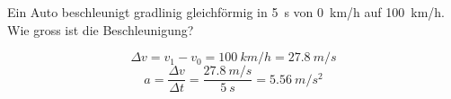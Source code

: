
\begin{aufgabe}
Ein Auto beschleunigt gradlinig gleichförmig in \SI{5}{s} von \SI{0}{km/h} auf \SI{100}{km/h}.
Wie gross ist die Beschleunigung?

\begin{loesung}
\[\Delta v = v_1-v_0=\SI{100}{km/h}= \SI{27.8}{m/s}\]
\[a=\frac{\Delta v}{\Delta t} =\frac{\SI{27.8}{m/s}}{\SI{5}{s}} = \SI{5.56}{m/s^2}\]
\end{loesung}
\end{aufgabe}

